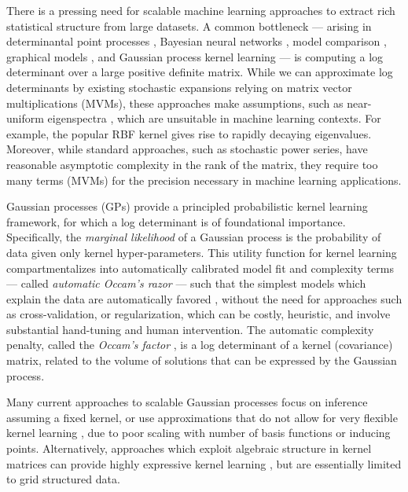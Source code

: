 There is a pressing need for scalable machine learning approaches to extract
rich statistical structure from large datasets. A common bottleneck --- arising
in determinantal point processes \cite{kulesza2012determinantal}, Bayesian
neural networks \cite{mackay1992bayesian}, model comparison 
\cite{mackay2003information}, graphical models \cite{rue2005gaussian}, and
Gaussian process kernel learning \cite{rasmussen06} --- is computing a log
determinant over a large positive definite matrix. While we can approximate log
determinants by existing stochastic expansions relying on matrix vector
multiplications (MVMs), these approaches make assumptions, such as near-uniform
eigenspectra \cite{boutsidis2015randomized}, which are unsuitable in machine
learning contexts. For example, the popular RBF kernel gives rise to rapidly
decaying eigenvalues. Moreover, while standard approaches, such as stochastic
power series, have reasonable asymptotic complexity in the rank of the matrix,
they require too many terms (MVMs) for the precision necessary in machine
learning applications.

Gaussian processes (GPs) provide a principled probabilistic kernel learning
framework, for which a log determinant is of foundational importance.
Specifically, the \emph{marginal likelihood} of a Gaussian process is the
probability of data given only kernel hyper-parameters. This utility function
for kernel learning compartmentalizes into automatically calibrated model fit
and complexity terms --- called \emph{automatic Occam's razor} --- such that the
simplest models which explain the data are automatically favored 
\cite{rasmussen01, rasmussen06}, without the need for approaches such as
cross-validation, or regularization, which can be costly, heuristic, and involve
substantial hand-tuning and human intervention. The automatic complexity
penalty, called the \emph{Occam's factor} \cite{mackay2003information}, is a log
determinant of a kernel (covariance) matrix, related to the volume of solutions
that can be expressed by the Gaussian process.

Many current approaches to scalable Gaussian processes \cite[e.g.,][]
{quinonero2005unifying, le2013fastfood, hensman2013uai} focus on inference
assuming a fixed kernel, or use approximations that do not allow for very
flexible kernel learning \cite{wilson2014thesis}, due to poor scaling with
number of basis functions or inducing points. Alternatively, approaches which
exploit algebraic structure in kernel matrices can provide highly expressive
kernel learning \cite{wilson2014fast}, but are essentially limited to grid structured data.

